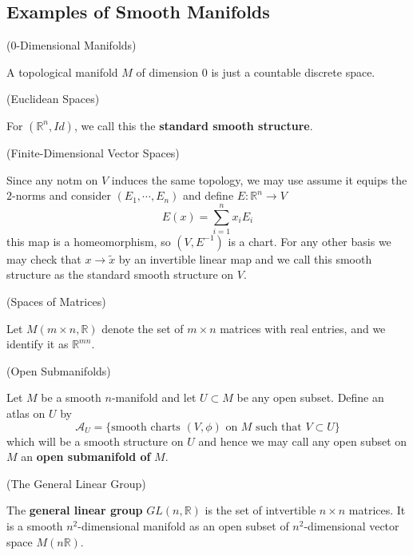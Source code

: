 \subsection{Examples of Smooth Manifolds}

\begin{example}(0-Dimensional Manifolds)\par
    A topological manifold $M$ of dimension $0$ is just a countable discrete space.
\end{example}

\begin{example}(Euclidean Spaces)\par
    For $(\mathbb{R}^n, Id)$, we call this the \textbf{standard smooth structure}. 
\end{example}

\begin{example}(Finite-Dimensional Vector Spaces)\par
    Since any notm on $V$ induces the same topology, we may use assume it equips the $2$-norms and consider $(E_1,\cdots,E_n)$ and define $E:\mathbb{R}^n\to V$
    \[E(x) = \sum\limits_{i=1}^n x_iE_i\]
    this map is a homeomorphism, so $(V,E^{-1})$ is a chart. For any other basis we may check that $x \to \tilde{x}$ by an invertible linear map and we call this smooth structure as the standard smooth structure on $V$.
\end{example}

\begin{example}(Spaces of Matrices)\par
    Let $M(m\times n,\mathbb{R})$ denote the set of $m\times n$ matrices with real entries, and we identify it as $\mathbb{R}^{mn}$.
\end{example}

\begin{example}(Open Submanifolds)\par
    Let $M$ be a smooth $n$-manifold and let $U\subset M$ be any open subset. Define an atlas on $U$ by
    \[\mathcal{A}_U = \{\text{smooth charts }(V,\phi)\text{ on }M\text{ such that }V\subset U\}\]
    which will be a smooth structure on $U$ and hence we may call any open subset on $M$ an \textbf{open submanifold of }$M$.
\end{example}

\begin{example}(The General Linear Group)\par
    The \textbf{general linear group} $GL(n,\mathbb{R})$ is the set of intvertible $n\times n$ matrices. It is a smooth $n^2$-dimensional manifold as an open subset of $n^2$-dimensional vector space $M(n\mathbb{R})$.
\end{example}

